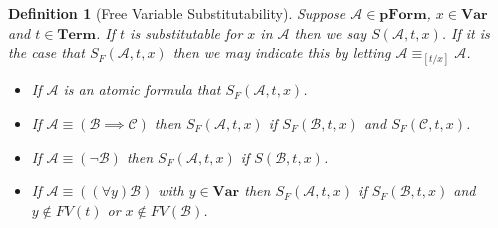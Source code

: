 \documentclass[12pt]{article}
\theoremstyle{break}
\newtheorem{definition}{Definition}[section]
\theoremstyle{break}
\theoremstyle{break}
\theoremstyle{break}
\theoremstyle{break}
\newtheorem{informal definition}[definition]{Informal Definition}
\newcommand{\mc}[1]{\mathcal{#1}}
\begin{document}
\begin{definition}[Free Variable Substitutability]
Suppose $\mc{A}\in\textbf{pForm}$, $x\in\textbf{Var}$ and $t\in\textbf{Term}$. If $t$ is substitutable for $x$ in $\mc{A}$ then we say $S(\mc{A}, t, x)$. If it is the case that $S_F(\mc{A},t , x)$ then we may indicate this by letting $\mc{A} \equiv _{[t/x]}\mc{A}$.

\begin{itemize}
\item{If $\mc{A}$ is an atomic formula that $S_F(\mc{A}, t, x)$.}
\item{If $\mc{A} \equiv (\mc{B}\implies \mc{C})$ then $S_F(\mc{A}, t, x)$ if $S_F(\mc{B}, t, x)$ and $S_F(\mc{C}, t, x)$.}
\item{If $\mc{A}\equiv (\lnot \mc{B})$ then $S_F(\mc{A}, t, x)$ if $S(\mc{B}, t, x)$.}
\item{If $\mc{A}\equiv((\forall y) \mc{B})$ with $y\in\textbf{Var}$ then $S_F(\mc{A}, t, x)$ if $S_F(\mc{B}, t, x)$ and $y\not \in FV(t)$ or $x\not \in FV(\mc{B})$.}
\end{itemize}

\end{definition}
\end{document}
